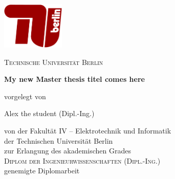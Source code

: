 
\begin{titlepage}
  \begin{center}
	  


	\centering
	\includegraphics[width=3cm]{figures/tub.pdf}\\
	\vspace{0.8em}
	\LARGE 

	\textsc{Technische Universit\"at Berlin}

    \vspace{1cm}

    \sffamily \LARGE \textbf{My new Master thesis titel comes here}

    \vspace{1.5cm}





    \normalsize vorgelegt von

    \vspace{.1cm}

    \large Alex the student (Dipl.-Ing.)

    \vspace{.8cm}



    \normalsize von der Fakult\"{a}t IV -- Elektrotechnik und Informatik\\
    \normalsize der Technischen Universit\"{a}t Berlin\\
    \normalsize zur Erlangung des akademischen Grades\\
    \large \textsc{Diplom der Ingenieurwissenschaften (Dipl.-Ing.)}\\
    \normalsize genemigte Diplomarbeit\\

    \vspace{1cm}


\end{center}
\end{titlepage}

